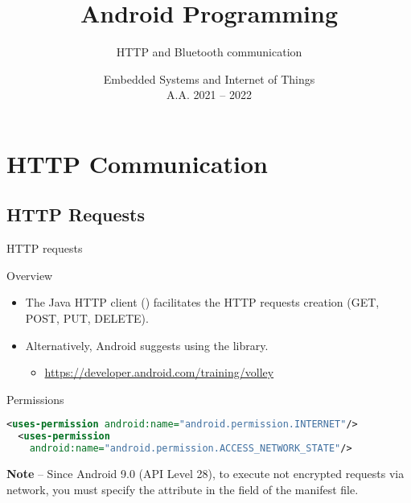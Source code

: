 \documentclass{beamer}
\title[Android -- 3A -- HTTP, Bluetooth]{Android Programming}
\subtitle{HTTP and Bluetooth communication}
\date[ver. 1.0 (20220505)]{Embedded Systems and Internet of Things\\A.A. 2021 -- 2022}
\begin{document}
  \begin{frame}
    \titlepage
  \end{frame}

  

  \section{HTTP Communication}

  \subsection{HTTP Requests}

  \begin{frame}[fragile]{HTTP requests}
    \begin{block}{Overview}
      \begin{itemize}
        \item The Java HTTP client ()
        facilitates the HTTP requests creation (GET, POST, PUT, DELETE).
        \item Alternatively, Android suggests using the  library. 
        \begin{itemize}
          \item \url{https://developer.android.com/training/volley}
        \end{itemize}
      \end{itemize}
    \end{block}

    \begin{exampleblock}{Permissions}
      \begin{lstlisting}[language=XML]
  <uses-permission android:name="android.permission.INTERNET"/>
  <uses-permission
    android:name="android.permission.ACCESS_NETWORK_STATE"/>
      \end{lstlisting}
    \end{exampleblock}

    {\small \textbf{Note} -- Since Android 9.0 (API Level 28), to execute not
    encrypted requests via network, you must specify the
     attribute in the
     field of the manifest file.}  

  \end{frame}
\end{document}
